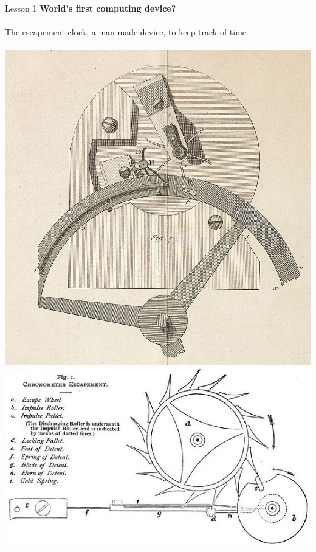 \documentclass[aspectratio=1610]{beamer}
\begin{document}
\begin{frame}{Lesson 1}{}
\Large
\textbf{World's first computing device?}\\~\\ 
The escapement clock, a man-made device, to keep track of
time.\\~\\ 
\includegraphics[scale=0.15]{Images/Le_Roy_escapement_mechanism}
\includegraphics[scale=0.25]{Images/chronometer_detent_escapement}

\end{frame}
\end{document}

